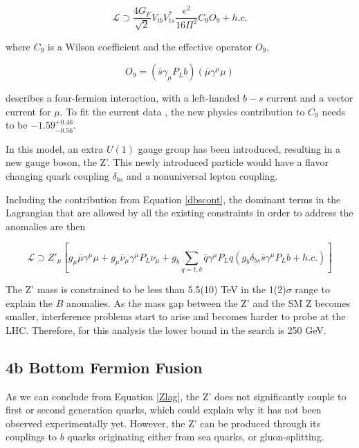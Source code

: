 \begin{equation}
\label{dbscont}
\mathcal{L} \supset \frac{4G_{F}}{\sqrt{2}}V_{tb}V_{ts}^{*}\frac{e^{2}}{16\Pi^{2}}C_{9}O_{9} + h.c.
\end{equation}

where $C_{9}$ is a Wilson coefficient and the effective operator $O_{9}$,

\begin{equation}
O_{9} = (\bar{s}\gamma_{\mu}P_{L}b)(\bar{\mu}\gamma^{\mu}\mu)
\end{equation}

describes a four-fermion interaction, with a left-handed $b-s$ current and a vector current for $\mu$. To fit the current data \cite{PhysRevD.96.055008}, the new physics contribution to $C_{9}$ needs to be $-1.59_{-0.56}^{+0.46}$.

In this model, an extra $U(1)$ gauge group has been introduced, resulting in a new gauge boson, the Z'. This newly introduced particle would have a flavor changing quark coupling $\delta_{bs}$ and a nonuniversal lepton coupling.

Including the contribution from Equation \ref{dbscont}, the dominant terms in the Lagrangian that are allowed by all the existing constraints in order to address the anomalies are then

\begin{equation}
\label{Zlag}
\mathcal{L} \supset Z'_{\mu}[g_{\mu}\bar{\mu}\gamma^{\mu}\mu + g_{\mu}\bar{\nu}_{\mu}\gamma^{\mu}P_{L}\nu_{\mu} + g_{b}\sum_{q=t,b}\bar{q}\gamma^{\mu}P_{L}q (g_{b}\delta_{bs}\bar{s}\gamma^{\mu}P_{L}b +h.c.)]
\end{equation}

The Z' mass is constrained to be less than 5.5(10) TeV in the 1(2)$\sigma$ range to explain the $B$ anomalies\cite{PhysRevD.89.095033}. As the mass gap between the Z' and the SM Z becomes smaller, interference problems start to arise and becomes harder to probe at the LHC. Therefore, for this analysis the lower bound in the search is 250 GeV.

\subsection{4b Bottom Fermion Fusion}

As we can conclude from Equation \ref{Zlag}, the Z' does not significantly couple to first or second generation quarks, which could explain why it has not been observed experimentally yet. However, the Z' can be produced through its couplings to $b$ quarks originating either from sea quarks, or gluon-splitting. 

